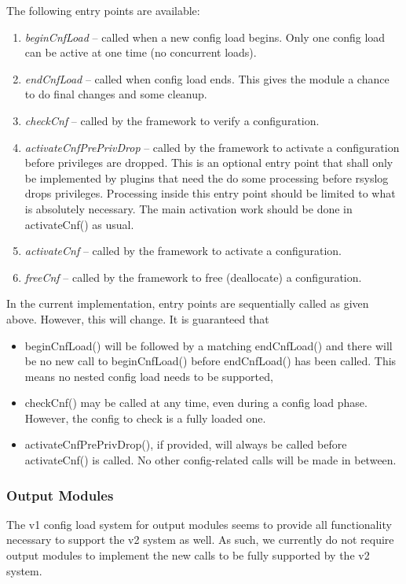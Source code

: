 \documentclass[a4paper,10pt]{article}
\begin{document}
The following entry points are available:
\begin{enumerate}
 \item \emph{beginCnfLoad} -- called when a new config load begins. Only one
config load can be active at one time (no concurrent loads).
 \item \emph{endCnfLoad} -- called when config load ends. This gives the module
a chance to do final changes and some cleanup.
 \item \emph{checkCnf} -- called by the framework to verify a configuration.
 \item \emph{activateCnfPrePrivDrop} -- called by the framework to activate a
configuration before privileges are dropped. This is an optional entry point
that shall only be implemented by plugins that need the do some processing
before rsyslog drops privileges. Processing inside this entry point should be
limited to what is absolutely necessary. The main activation work should be
done in activateCnf() as usual. 
 \item \emph{activateCnf} -- called by the framework to activate a
configuration. 
\item \emph{freeCnf} -- called by the framework to free
(deallocate) a configuration. 
\end{enumerate}

In the current implementation, entry points are sequentially called as given
above. However, this will change. It is guaranteed that
\begin{itemize}
 \item beginCnfLoad() will be followed by a matching endCnfLoad() and there
will be no new call to beginCnfLoad() before endCnfLoad() has been called. This
means no nested config load needs to be supported,
 \item checkCnf() may be called at any time, even during a config load phase.
However, the config to check is a fully loaded one.
 \item activateCnfPrePrivDrop(), if provided, will always be called before
activateCnf() is called. No other config-related calls will be made in between.
\end{itemize}

\subsubsection{Output Modules}
The v1 config load system for output modules seems to provide all functionality
necessary to support the v2 system as well. As such, we currently do not
require output modules to implement the new calls to be fully supported by the
v2 system.
\end{document}
